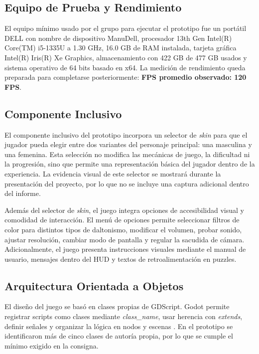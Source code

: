 \documentclass[conference]{IEEEtran}
\begin{document}
\subsection{Equipo de Prueba y Rendimiento}
El equipo mínimo usado por el grupo para ejecutar el prototipo fue un portátil DELL con nombre de dispositivo ManuDell, procesador 13th Gen Intel(R) Core(TM) i5-1335U a 1.30 GHz, 16.0 GB de RAM instalada, tarjeta gráfica Intel(R) Iris(R) Xe Graphics, almacenamiento con 422 GB de 477 GB usados y sistema operativo de 64 bits basado en x64. La medición de rendimiento queda preparada para completarse posteriormente: \textbf{FPS promedio observado: 120 FPS}.

\subsection{Componente Inclusivo}
El componente inclusivo del prototipo incorpora un selector de \textit{skin} para que el jugador pueda elegir entre dos variantes del personaje principal: una masculina y una femenina. Esta selección no modifica las mecánicas de juego, la dificultad ni la progresión, sino que permite una representación básica del jugador dentro de la experiencia. La evidencia visual de este selector se mostrará durante la presentación del proyecto, por lo que no se incluye una captura adicional dentro del informe.

Además del selector de \textit{skin}, el juego integra opciones de accesibilidad visual y comodidad de interacción. El menú de opciones permite seleccionar filtros de color para distintos tipos de daltonismo, modificar el volumen, probar sonido, ajustar resolución, cambiar modo de pantalla y regular la sacudida de cámara. Adicionalmente, el juego presenta instrucciones visuales mediante el manual de usuario, mensajes dentro del HUD y textos de retroalimentación en puzzles.

\subsection{Arquitectura Orientada a Objetos}
El diseño del juego se basó en clases propias de GDScript. Godot permite registrar scripts como clases mediante \textit{class\_name}, usar herencia con \textit{extends}, definir señales y organizar la lógica en nodos y escenas \cite{godotdocs}. En el prototipo se identificaron más de cinco clases de autoría propia, por lo que se cumple el mínimo exigido en la consigna.
\end{document}
